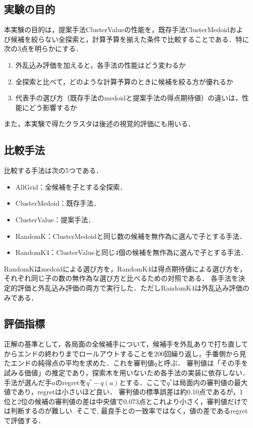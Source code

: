 \documentclass[submit]{ipsj}
\begin{document}
\subsection{実験の目的}
本実験の目的は，提案手法ClusterValueの性能を，既存手法ClusterMedoidおよび候補を絞らない全探索と，計算予算を揃えた条件で比較することである．特に次の3点を明らかにする．
\begin{enumerate}
\setlength{\itemsep}{0pt}
\item 外乱込み評価を加えると，各手法の性能はどう変わるか
\item 全探索と比べて，どのような計算予算のときに候補を絞る方が優れるか
\item 代表手の選び方（既存手法のmedoidと提案手法の得点期待値）の違いは，性能にどう影響するか
\end{enumerate}

また，本実験で得たクラスタは後述の視覚的評価にも用いる．

\subsection{比較手法}
比較する手法は次の5つである．
\begin{itemize}
\setlength{\itemsep}{0pt}
\item AllGrid：全候補を子とする全探索．
\item ClusterMedoid：既存手法．
\item ClusterValue：提案手法．
\item RandomK：ClusterMedoidと同じ数の候補を無作為に選んで子とする手法．
\item RandomK4：ClusterValueと同じ4個の候補を無作為に選んで子とする手法．
\end{itemize}

RandomKはmedoidによる選び方を，RandomK4は得点期待値による選び方を，それぞれ同じ子の数の無作為な選び方と比べるための対照である．
各手法を決定的評価と外乱込み評価の両方で実行した．ただしRandomK4は外乱込み評価のみである．

\subsection{評価指標}
正解の基準として，各局面の全候補手について，候補手を外乱ありで打ち直してからエンドの終わりまでロールアウトすることを200回繰り返し，手番側から見たエンドの純得点の平均を求めた．これを審判値$q$と呼ぶ．
審判値は「その手を試みる価値」の推定であり，探索木を用いないため各手法の実装に依存しない．
手法が選んだ手$a$のregretを$q^{*}-q(a)$とする．ここで$q^{*}$は局面内の審判値の最大値であり，regretは小さいほど良い．
審判値の標準誤差は約0.10点であるが，1位と2位の候補の審判値の差は中央値で0.073点とこれより小さく，審判値だけでは判断するのが難しい.
そこで, 最良手との一致率ではなく，値の差であるregretで評価する．
\end{document}
